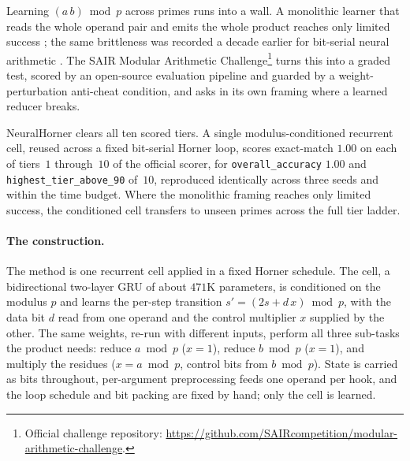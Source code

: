 \documentclass[11pt]{article}
\begin{document}
Learning $(a\,b)\bmod p$ across primes runs into a wall. A monolithic learner that
reads the whole operand pair and emits the whole product reaches only
limited success \citep{lauter2024modular}; the
same brittleness was recorded a decade earlier for bit-serial neural arithmetic
\citep{kaiser2016neural, price2016neural}. The SAIR Modular Arithmetic
Challenge\footnote{Official challenge repository: \url{https://github.com/SAIRcompetition/modular-arithmetic-challenge}.}
turns this into a graded test, scored by an open-source evaluation pipeline and
guarded by a weight-perturbation anti-cheat condition, and asks in its own framing
where a learned reducer breaks.

NeuralHorner clears all ten scored tiers. A single modulus-conditioned recurrent
cell, reused across a fixed bit-serial Horner loop, scores exact-match $1.00$ on
each of tiers~$1$ through~$10$ of the official scorer, for
\texttt{overall\_accuracy} $1.00$ and \texttt{highest\_tier\_above\_90} of~$10$,
reproduced identically across three seeds and within the time budget. Where the
monolithic framing reaches only limited success, the conditioned
cell transfers to unseen primes across the full tier ladder.

\paragraph{The construction.}
The method is one recurrent cell applied in a fixed Horner schedule. The cell, a
bidirectional two-layer GRU of about $471$K parameters, is conditioned on the
modulus $p$ and learns the per-step transition $s' = (2s + d\,x)\bmod p$, with the
data bit $d$ read from one operand and the control multiplier $x$ supplied by the
other. The same weights, re-run with different inputs, perform all three sub-tasks
the product needs: reduce $a \bmod p$ ($x{=}1$), reduce $b \bmod p$ ($x{=}1$), and
multiply the residues ($x = a\bmod p$, control bits from $b\bmod p$). State is
carried as bits throughout, per-argument preprocessing feeds one operand per hook,
and the loop schedule and bit packing are fixed by hand; only the cell is learned.
\end{document}
